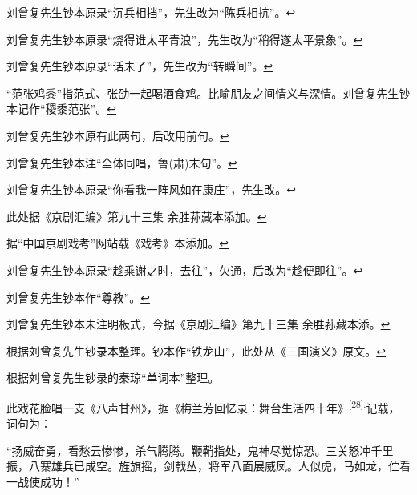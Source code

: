   \leavevmode\hypertarget{fn658}{}%
  刘曾复先生钞本原录``沉兵相挡''，先生改为``陈兵相抗''。\protect\hyperlink{fnref658}{↩}
\item
  \leavevmode\hypertarget{fn659}{}%
  刘曾复先生钞本原录``烧得谁太平青浪''，先生改为``稍得遂太平景象''。\protect\hyperlink{fnref659}{↩}
\item
  \leavevmode\hypertarget{fn660}{}%
  刘曾复先生钞本原录``话未了''，先生改为``转瞬间''。\protect\hyperlink{fnref660}{↩}
\item
  \leavevmode\hypertarget{fn661}{}%
  ``范张鸡黍''指范式、张劭一起喝酒食鸡。比喻朋友之间情义与深情。刘曾复先生钞本记作``稷黍范张''。\protect\hyperlink{fnref661}{↩}
\item
  \leavevmode\hypertarget{fn662}{}%
  刘曾复先生钞本原有此两句，后改用前句。\protect\hyperlink{fnref662}{↩}
\item
  \leavevmode\hypertarget{fn663}{}%
  刘曾复先生钞本注``全体同唱，鲁(肃)末句''。\protect\hyperlink{fnref663}{↩}
\item
  \leavevmode\hypertarget{fn664}{}%
  刘曾复先生钞本原录``你看我一阵风如在康庄''，先生改。\protect\hyperlink{fnref664}{↩}
\item
  \leavevmode\hypertarget{fn665}{}%
  此处据《京剧汇编》第九十三集
  余胜荪藏本添加。\protect\hyperlink{fnref665}{↩}
\item
  \leavevmode\hypertarget{fn666}{}%
  据``中国京剧戏考''网站载《戏考》本添加。\protect\hyperlink{fnref666}{↩}
\item
  \leavevmode\hypertarget{fn667}{}%
  刘曾复先生钞本原录``趁乘谢之时，去往''，欠通，后改为``趁便即往''。\protect\hyperlink{fnref667}{↩}
\item
  \leavevmode\hypertarget{fn668}{}%
  刘曾复先生钞本作``尊教''。\protect\hyperlink{fnref668}{↩}
\item
  \leavevmode\hypertarget{fn669}{}%
  刘曾复先生钞本未注明板式，今据《京剧汇编》第九十三集
  余胜荪藏本添。\protect\hyperlink{fnref669}{↩}
\item
  \leavevmode\hypertarget{fn670}{}%
  根据刘曾复先生钞录本整理。钞本作``铁龙山''，此处从《三国演义》原文。\protect\hyperlink{fnref670}{↩}
\item
  \leavevmode\hypertarget{fn671}{}%
  根据刘曾复先生钞录的秦琼``单词本''整理。

  此戏花脸唱一支《八声甘州》，据《梅兰芳回忆录：舞台生活四十年》\textsuperscript{{[}28{]}.}记载，词句为：

  ``扬威奋勇，看愁云惨惨，杀气腾腾。鞭鞘指处，鬼神尽觉惊恐。三关怒冲千里振，八寨雄兵已成空。旌旗摇，剑戟丛，将军八面展威凤。人似虎，马如龙，伫看一战使成功！''

